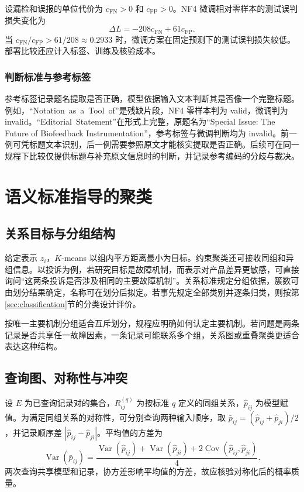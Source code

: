 \documentclass[UTF8,a4paper,zihao=-4,fontset=fandol]{ctexart}
\newcommand{\Var}{\operatorname{Var}}
\begin{document}
设漏检和误报的单位代价为 $c_{\mathrm{FN}}>0$ 和 $c_{\mathrm{FP}}>0$。NF4 微调相对零样本的测试误判损失变化为
\begin{equation}
 \Delta L=-208c_{\mathrm{FN}}+61c_{\mathrm{FP}}.
 \label{eq:title-cost}
\end{equation}
当 $c_{\mathrm{FN}}/c_{\mathrm{FP}}>61/208\approx0.2933$ 时，微调方案在固定预测下的测试误判损失较低。部署比较还应计入标签、训练及核验成本。

\subsubsection{判断标准与参考标签}

参考标签记录题名提取是否正确，模型依据输入文本判断其是否像一个完整标题。例如，“\mbox{Notation as a Tool of}”是残缺片段，NF4 零样本判为 valid，微调判为 invalid。“\mbox{Editorial Statement}”在形式上完整，原题名为“Special Issue: The Future of Biofeedback Instrumentation”，参考标签与微调判断均为 invalid。前一例可凭标题文本识别，后一例需要参照原文才能核实提取是否正确。后续可在同一规程下比较仅提供标题与补充原文信息时的判断，并记录参考编码的分歧与裁决。

\section{语义标准指导的聚类}\label{sec:clustering}

\subsection{关系目标与分组结构}

给定表示 $z_i$，$K$-means 以组内平方距离最小为目标。约束聚类还可接收同组和异组信息\citep{wagstaff2001}。以投诉为例，若研究目标是故障机制，而表示对产品差异更敏感，可直接询问“这两条投诉是否涉及相同的主要故障机制”。关系标准规定分组依据，簇数可由划分结果确定，名称可在划分后拟定。若事先规定全部类别并逐条归类，则按第\ref{sec:classification}节的分类设计评价。

按唯一主要机制分组适合互斥划分，规程应明确如何认定主要机制。若问题是两条记录是否共享任一故障因素，一条记录可能联系多个组，关系图或重叠聚类更适合表达这种结构。

\subsection{查询图、对称性与冲突}

设 $E$ 为已查询记录对的集合，$R_{ij}^{(q)}$ 为按标准 $q$ 定义的同组关系，$\widehat p_{ij}$ 为模型赋值。为满足同组关系的对称性，可分别查询两种输入顺序，取 $\bar p_{ij}=(\widehat p_{ij}+\widehat p_{ji})/2$，并记录顺序差 $|\widehat p_{ij}-\widehat p_{ji}|$。平均值的方差为
\begin{equation}
 \Var(\bar p_{ij})=
 \frac{\Var(\widehat p_{ij})+\Var(\widehat p_{ji})
 +2\operatorname{Cov}(\widehat p_{ij},\widehat p_{ji})}{4}.
 \label{eq:symmetry}
\end{equation}
两次查询共享模型和记录，协方差影响平均值的方差，故应核验对称化后的概率质量。
\end{document}

